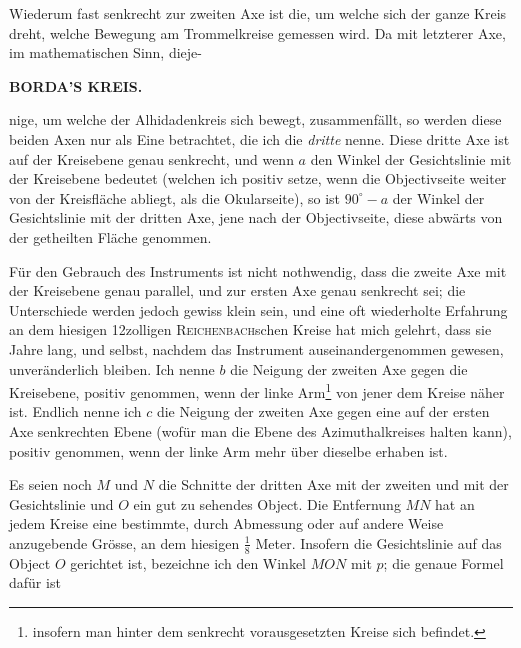 \par\indent Wiederum fast senkrecht zur zweiten Axe ist die, um welche sich der ganze Kreis dreht, welche Bewegung am Trommelkreise gemessen wird. Da mit letzterer Axe, im mathematischen Sinn, dieje-\par
\clearpage
\thispagestyle{empty}
\noindent{}%
\makebox[12mm][l]{}%
\parbox[t]{\dimexpr\linewidth-24mm\relax}{\centering\footnotesize\bfseries BORDA’S KREIS.\par}%
\par\nobreak\medskip
\noindent nige, um welche der Alhidadenkreis sich bewegt, zusammenfällt, so werden diese beiden Axen nur als Eine betrachtet, die ich die \emph{dritte} nenne. Diese dritte Axe ist auf der Kreisebene genau senkrecht, und wenn $a$ den Winkel der Gesichtslinie mit der Kreisebene bedeutet (welchen ich positiv setze, wenn die Objectivseite weiter von der Kreisfläche abliegt, als die Okularseite), so ist $90^\circ{-}a$ der Winkel der Gesichtslinie mit der dritten Axe, jene nach der Objectivseite, diese abwärts von der getheilten Fläche genommen.

\par\indent Für den Gebrauch des Instruments ist nicht nothwendig, dass die zweite Axe mit der Kreisebene genau parallel, und zur ersten Axe genau senkrecht sei; die Unterschiede werden jedoch gewiss klein sein, und eine oft wiederholte Erfahrung an dem hiesigen 12zolligen \textsc{Reichenbach}schen Kreise hat mich gelehrt, dass sie Jahre lang, und selbst, nachdem das Instrument auseinandergenommen gewesen, unveränderlich bleiben. Ich nenne $b$ die Neigung der zweiten Axe gegen die Kreisebene, positiv genommen, wenn der linke Arm\footnote{insofern man hinter dem senkrecht vorausgesetzten Kreise sich befindet.} von jener dem Kreise näher ist. Endlich nenne ich $c$ die Neigung der zweiten Axe gegen eine auf der ersten Axe senkrechten Ebene (wofür man die Ebene des Azimuthalkreises halten kann), positiv genommen, wenn der linke Arm mehr über dieselbe erhaben ist.

\par\indent Es seien noch $M$ und $N$ die Schnitte der dritten Axe mit der zweiten und mit der Gesichtslinie und $O$ ein gut zu sehendes Object. Die Entfernung $MN$ hat an jedem Kreise eine bestimmte, durch Abmessung oder auf andere Weise anzugebende Grösse, an dem hiesigen $\frac{1}{8}$ Meter. Insofern die Gesichtslinie auf das Object $O$ gerichtet ist, bezeichne ich den Winkel $MON$ mit $p$; die genaue Formel dafür ist

